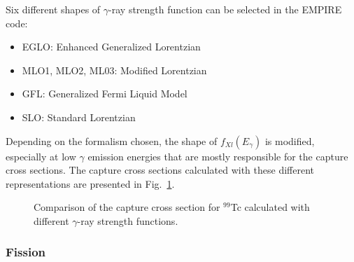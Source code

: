 \documentclass[twocolumn,amsmath,amssymb,10pt,groupedaddress,a4paper]{revtex4}
\begin{document}
Six different
shapes of $\gamma$-ray strength function can be selected in the EMPIRE code:
\begin{itemize}
\item  EGLO: Enhanced Generalized Lorentzian~\cite{kop01}
\item  MLO1, MLO2, ML03: Modified Lorentzian~\cite{plu01,plu02,plu03}
\item  GFL: Generalized Fermi Liquid Model~\cite{mug01}
\item  SLO: Standard Lorentzian~\cite{bri01}
\end{itemize}
Depending on the formalism chosen, the shape of $f_{Xl}(E_{\gamma})$ is modified, especially at low $\gamma$ emission
 energies that are mostly responsible for the capture cross sections. The capture cross sections calculated
with these different representations are presented in Fig.~\ref{unresolved01}.
\begin{figure}[htbp]
\caption{Comparison of the capture cross section for $^{99}$Tc calculated with
different $\gamma$-ray strength functions.}
\label{unresolved01}
\end{figure}


\subsubsection{Fission}
\end{document}
